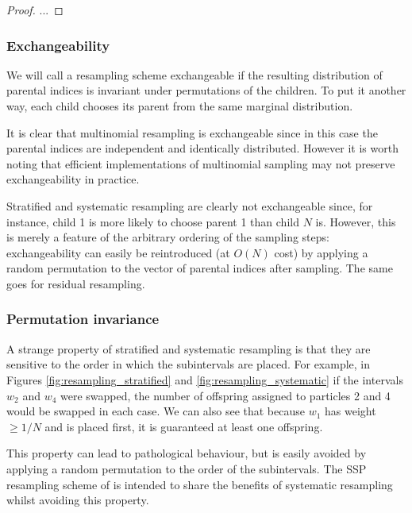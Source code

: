 \begin{proof}
...
\end{proof}




\subsubsection{Exchangeability \seb{$\checkmark$} }
We will call a resampling scheme exchangeable if the resulting distribution of parental indices is invariant under permutations of the children. To put it another way, each child chooses its parent from the same marginal distribution.

It is clear that multinomial resampling is exchangeable since in this case the parental indices are independent and identically distributed. However it is worth noting that efficient implementations of multinomial sampling may not preserve exchangeability in practice.

Stratified and systematic resampling are clearly not exchangeable since, for instance, child 1 is more likely to choose parent 1 than child $N$ is. However, this is merely a feature of the arbitrary ordering of the sampling steps: exchangeability can easily be reintroduced (at $O(N)$ cost) by applying a random permutation to the vector of parental indices after sampling.
The same goes for residual resampling.





\subsubsection{Permutation invariance \seb{$\checkmark$} }
A strange property of stratified and systematic resampling is that they are sensitive to the order in which the subintervals are placed. For example, in Figures \ref{fig:resampling_stratified} and \ref{fig:resampling_systematic} if the intervals $w_2$ and $w_4$ were swapped, the number of offspring assigned to particles 2 and 4 would be swapped in each case. 
We can also see that because $w_1$ has weight $\geq 1/N$ and is placed first, it is guaranteed at least one offspring.

This property can lead to pathological behaviour, but is easily avoided by applying a random permutation to the order of the subintervals.
The SSP resampling scheme of \textcite{gerber2017} is intended to share the benefits of systematic resampling whilst avoiding this property.




